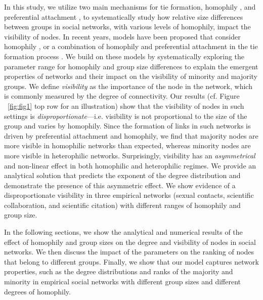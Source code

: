 


In this study, we utilize two main mechanisms for tie formation, homophily \cite{mcpherson2001birds}, and preferential attachment \cite{Barabasi99}, to systematically study how relative size differences between groups in social networks, with various levels of homophily, impact the visibility of nodes.  %
In recent years, models have been proposed that consider homophily \cite{bramoulle2012homophily,currarini2010identifying}, or a combination of homophily and preferential attachment in the tie formation process \cite{papadopoulos2012popularity,de2013scale,avin2015homophily}. We build on these models by systematically exploring the parameter range for homophily and group size differences to explain the emergent properties of networks and their impact on the visibility of minority and majority groups. We define \emph{visibility} as the  importance of the node in the network, which is commonly measured by the degree of connectivity. Our results (cf. Figure ~\ref{fig:fig1} top row for an illustration) show that the visibility of nodes in such settings is \emph{disproportionate}---i.e. visibility is not proportional to the size of the group and varies by homophily.
Since the formation of links in such networks is driven by preferential attachment and homophily, we find that majority nodes are more visible in homophilic networks than expected, whereas minority nodes are more visible in heterophilic networks. Surprisingly, visibility has an \emph{asymmetrical} and non-linear effect in both homophilic and heterophilic regimes. We provide an analytical solution that predicts the exponent of the degree distribution and demonstrate the presence of this asymmetric effect. We show evidence of a disproportionate visibility in three empirical networks (sexual contacts, scientific collaboration, and scientific citation) with different ranges of homophily and group size.


In the following sections, we show the analytical and numerical results of the effect of homophily and group sizes on the degree and visibility of nodes in social networks. We then discuss the impact of the parameters on the ranking of nodes that belong to different groups. Finally, we show that our model captures network properties, such as the degree distributions and ranks of the majority and minority in empirical social networks with different group sizes and different degrees of homophily. 




